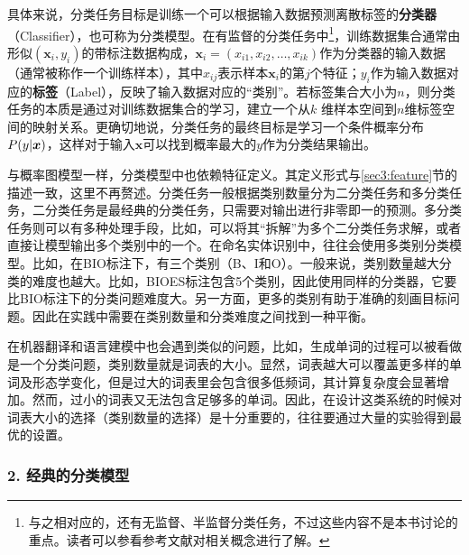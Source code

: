 \parinterval 具体来说，分类任务目标是训练一个可以根据输入数据预测离散标签的{\small\sffamily\bfseries{分类器}}（Classifier），也可称为分类模型。在有监督的分类任务中\footnote{与之相对应的，还有无监督、半监督分类任务，不过这些内容不是本书讨论的重点。读者可以参看参考文献对相关概念进行了解。}，训练数据集合通常由形似$(\boldsymbol{x}_i,y_i)$的带标注数据构成，$\boldsymbol{x}_i=(x_{i1},x_{i2},\ldots,x_{ik})$作为分类器的输入数据（通常被称作一个训练样本），其中$x_{ij}$表示样本$\boldsymbol{x}_i$的第$j$个特征；$y_i$作为输入数据对应的{\small\sffamily\bfseries{标签}}（Label），反映了输入数据对应的“类别”。若标签集合大小为$n$，则分类任务的本质是通过对训练数据集合的学习，建立一个从$k$ 维样本空间到$n$维标签空间的映射关系。更确切地说，分类任务的最终目标是学习一个条件概率分布${P}(y|\boldsymbol{x})$，这样对于输入$\boldsymbol{x}$可以找到概率最大的$y$作为分类结果输出。

\parinterval 与概率图模型一样，分类模型中也依赖特征定义。其定义形式与\ref{sec3:feature}节的描述一致，这里不再赘述。分类任务一般根据类别数量分为二分类任务和多分类任务，二分类任务是最经典的分类任务，只需要对输出进行非零即一的预测。多分类任务则可以有多种处理手段，比如，可以将其“拆解”为多个二分类任务求解，或者直接让模型输出多个类别中的一个。在命名实体识别中，往往会使用多类别分类模型。比如，在BIO标注下，有三个类别（B、I和O）。一般来说，类别数量越大分类的难度也越大。比如，BIOES标注包含5个类别，因此使用同样的分类器，它要比BIO标注下的分类问题难度大。另一方面，更多的类别有助于准确的刻画目标问题。因此在实践中需要在类别数量和分类难度之间找到一种平衡。

\parinterval 在机器翻译和语言建模中也会遇到类似的问题，比如，生成单词的过程可以被看做是一个分类问题，类别数量就是词表的大小。显然，词表越大可以覆盖更多样的单词及形态学变化，但是过大的词表里会包含很多低频词，其计算复杂度会显著增加。然而，过小的词表又无法包含足够多的单词。因此，在设计这类系统的时候对词表大小的选择（类别数量的选择）是十分重要的，往往要通过大量的实验得到最优的设置。


\subsubsection{2. 经典的分类模型}

